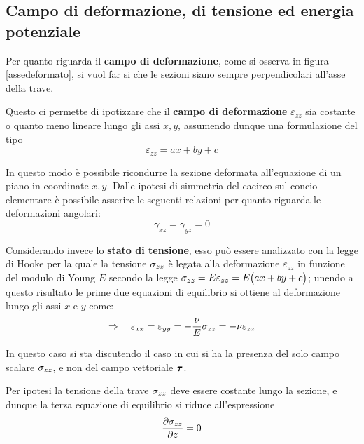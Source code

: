 	\subsection{Campo di deformazione, di tensione ed energia potenziale}
		
		Per quanto riguarda il \textbf{campo di deformazione}, come si osserva in figura \ref{assedeformato}, si vuol far si che le sezioni siano sempre perpendicolari all'asse della trave.
		\begin{concetto}
			Questo ci permette di ipotizzare che il \textbf{campo di deformazione} $\varepsilon_{zz}$ sia costante o quanto meno lineare lungo gli assi $x,y$, assumendo dunque una formulazione del tipo
			\begin{equation} \label{eq:sv:ipotesideflin}
				\varepsilon_{zz} = ax + by + c
			\end{equation}
		\end{concetto}
		In questo modo è possibile ricondurre la sezione deformata all'equazione di un piano in coordinate $x,y$. Dalle ipotesi di simmetria del cacirco sul concio elementare è possibile asserire le seguenti relazioni per quanto riguarda le deformazioni angolari:
		\[ \gamma_{xz} = \gamma_{yz} = 0  \]
		
		Considerando invece lo \textbf{stato di tensione}, esso può essere analizzato con la legge di Hooke per la quale la tensione $\sigma_{zz}$ è legata alla deformazione $\varepsilon_{zz}$ in funzione del modulo di Young $E$ secondo la legge $ \sigma_{zz} = E\varepsilon_{zz} = E\big(ax + by + c\big)$; unendo a questo risultato le prime due equazioni di equilibrio si ottiene al deformazione lungo gli assi $x$ e $y$ come:
		\[ \Rightarrow \quad \varepsilon_{xx} = \varepsilon_{yy} = - \frac \nu E \sigma_{zz} = - \nu \varepsilon_{zz} \]
		
		\begin{nota}
			In questo caso si sta discutendo il caso in cui si ha la presenza del solo campo scalare $\sigma_{zz}$, e non del campo vettoriale $\boldsymbol{\tau}$.
		\end{nota}
		Per ipotesi la tensione della trave $\sigma_{zz}$ deve essere costante lungo la sezione, e dunque la terza equazione di equilibrio si riduce all'espressione
		\[ \frac{\partial \sigma_{zz}}{\partial z} = 0 \]
		
